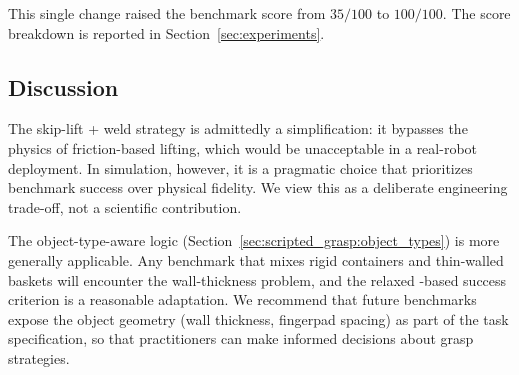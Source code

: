 This single change raised the benchmark score from $35/100$ to $100/100$. The score breakdown is reported in Section~\ref{sec:experiments}.

\subsection{Discussion}
\label{sec:scripted_grasp:discussion}

The skip-lift + weld strategy is admittedly a simplification: it bypasses the physics of friction-based lifting, which would be unacceptable in a real-robot deployment. In simulation, however, it is a pragmatic choice that prioritizes benchmark success over physical fidelity. We view this as a deliberate engineering trade-off, not a scientific contribution.

The object-type-aware logic (Section~\ref{sec:scripted_grasp:object_types}) is more generally applicable. Any benchmark that mixes rigid containers and thin-walled baskets will encounter the wall-thickness problem, and the relaxed -based success criterion is a reasonable adaptation. We recommend that future benchmarks expose the object geometry (wall thickness, fingerpad spacing) as part of the task specification, so that practitioners can make informed decisions about grasp strategies.
